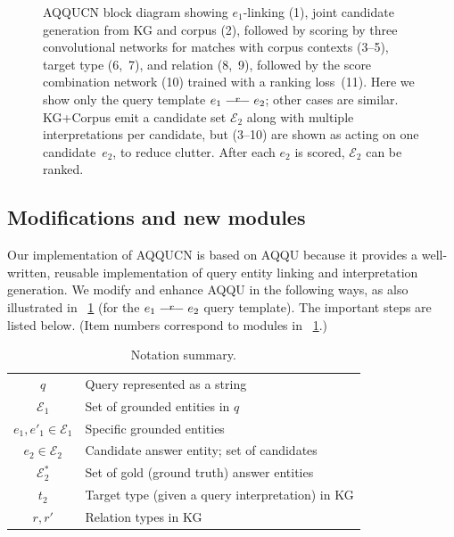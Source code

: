 \documentclass{svjour3}
\def\longbar{\relbar\joinrel\relbar\joinrel\relbar}
\begin{document}
\begin{figure}[ht]
  \caption{AQQUCN block diagram showing $e_1$-linking (1), joint candidate generation from KG and corpus (2), followed by scoring by three convolutional networks for matches with corpus contexts (3--5), target type (6,~7), and relation (8,~9), followed by the score combination network (10) trained with a ranking loss~(11).  Here we show only the query template $e_1 \stackrel{r}{\longbar} e_2$; other cases are similar.  KG+Corpus emit a candidate set $\mathcal{E}_2$ along with multiple interpretations per candidate, but (3--10) are shown as acting on one candidate~$e_2$, to reduce clutter.  After each $e_2$ is scored, $\mathcal{E}_2$ can be ranked.}
\label{fig:aqqucn-block-diagram}
\end{figure}



\subsection{Modifications and new modules}
\label{sec:AqquChanges}

Our implementation of AQQUCN is based on AQQU because it provides a well-written, reusable implementation of query entity linking and interpretation generation.  We modify and enhance AQQU in the following ways, as also illustrated in \figurename~\ref{fig:aqqucn-block-diagram} (for the $e_1 \stackrel{r}{\longbar} e_2$ query template).  The important steps are listed below.  (Item numbers correspond to modules in \figurename~\ref{fig:aqqucn-block-diagram}.)

\begin{table}[th]
\begin{tabular}{|c|l|} \hline
$q$ & Query represented as a string \\
$\mathcal{E}_1$ & Set of grounded entities in $q$ \\
$e_1, e'_1 \in \mathcal{E}_1$ & Specific grounded entities \\
$e_2 \in \mathcal{E}_2$ & Candidate answer entity;
set of candidates \\
$\mathcal{E}^*_2$ & Set of gold (ground truth) answer entities \\
$t_2$ & Target type (given a query interpretation) in KG \\
$r, r'$ & Relation types in KG \\ \hline
\end{tabular}
\caption{Notation summary.}
\label{tab:Notation0}
\end{table}
\end{document}
